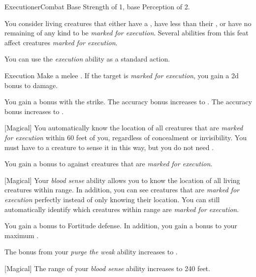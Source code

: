     \begin{feat}{Executioner}{Combat}
        \featpres Base Strength of 1, base Perception of 2.

         You consider living creatures that either have a , have less than their , or have no remaining  of any kind to be \textit{marked for execution}.
        Several abilities from this feat affect creatures \textit{marked for execution}.

         You can use the \textit{execution} ability as a standard action.
        \begin{freeability}{Execution}
            Make a melee .
            If the target is \textit{marked for execution}, you gain a \plus2d bonus to damage.

            \rankline
             You gain a   bonus with the strike.
             The accuracy bonus increases to .
             The accuracy bonus increases to .
        \end{freeability}

        [Magical] You automatically know the location of all creatures that are \textit{marked for execution} within 60 feet of you, regardless of concealment or invisibility.
        You must have  to a creature to sense it in this way, but you do not need .

         You gain a  bonus to  against creatures that are \textit{marked for execution}.

        [Magical] Your \textit{blood sense} ability allows you to know the location of all living creatures within range.
        In addition, you can see creatures that are \textit{marked for execution} perfectly instead of only knowing their location.
        You can still automatically identify which creatures within range are \textit{marked for execution}.

         You gain a  bonus to Fortitude defense.
        In addition, you gain a  bonus to your maximum .

         The bonus from your \textit{purge the weak} ability increases to .

        [Magical] The range of your \textit{blood sense} ability increases to 240 feet.
    \end{feat}

